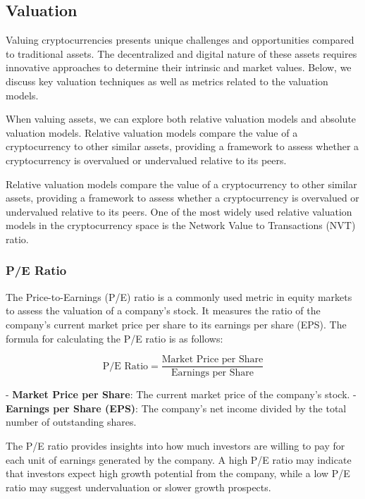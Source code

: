 \subsection{Valuation}

Valuing cryptocurrencies presents unique challenges and opportunities compared to traditional assets. The decentralized and digital nature of these assets requires innovative approaches to determine their intrinsic and market values. Below, we discuss key valuation techniques as well as metrics related to the valuation models.

When valuing assets, we can explore both relative valuation models and absolute valuation models. Relative valuation models compare the value of a cryptocurrency to other similar assets, providing a framework to assess whether a cryptocurrency is overvalued or undervalued relative to its peers.


Relative valuation models compare the value of a cryptocurrency to other similar assets, providing a framework to assess whether a cryptocurrency is overvalued or undervalued relative to its peers. One of the most widely used relative valuation models in the cryptocurrency space is the Network Value to Transactions (NVT) ratio.

\subsubsection{P/E Ratio}

The Price-to-Earnings (P/E) ratio is a commonly used metric in equity markets to assess the valuation of a company's stock. It measures the ratio of the company's current market price per share to its earnings per share (EPS). The formula for calculating the P/E ratio is as follows:

\begin{equation}\label{eq:pe_ratio}
\text{P/E Ratio} = \frac{\text{Market Price per Share}}{\text{Earnings per Share}}
\end{equation}

- \textbf{Market Price per Share}: The current market price of the company's stock.
- \textbf{Earnings per Share (EPS)}: The company's net income divided by the total number of outstanding shares.

The P/E ratio provides insights into how much investors are willing to pay for each unit of earnings generated by the company. A high P/E ratio may indicate that investors expect high growth potential from the company, while a low P/E ratio may suggest undervaluation or slower growth prospects.



